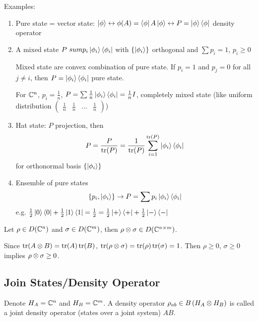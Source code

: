 Examples:
\begin{enumerate}[label=\protect\cir{\arabic*}]
    \item Pure state = vector state: $\left|\phi\right\rangle \leftrightarrow \phi(A) = \left\langle \phi\right|A\left|\phi\right\rangle \leftrightarrow P = \left|\phi\right\rangle\left\langle \phi\right|$ density operator
    \item A mixed state $P \ sum p_i\left|\phi_i\right\rangle\left\langle \phi_i\right|$ with $\left\lbrace\left|\phi_i\right\rangle\right\rbrace$ orthogonal and $\sum p_i = 1$, $p_i \geq 0$

          Mixed state are convex combination of pure state. If $p_i = 1$ and $p_j = 0$ for all $j \neq i$, then
          $P = \left|\phi_i\right\rangle\left\langle \phi_i\right|$ pure state.

          For $\mathbb{C}^n$, $p_i = \frac{1}{n}$,
          $P = \sum \frac{1}{n} \left|\phi_i\right\rangle\left\langle \phi_i\right| = \frac{1}{n}I$, completely mixed state
          (like uniform distribution $\begin{pmatrix}\frac{1}{n}&\frac{1}{n}&\dots&\frac{1}{n}\end{pmatrix}$)
    \item Hat state: $P$ projection, then \[P = \frac{P}{\operatorname{tr}(P)} = \frac{1}{\operatorname{tr}(P)}\sum_{i=1}^{\operatorname{tr}(P)}\left|\phi_i\right\rangle\left\langle \phi_i\right|\]
          for orthonormal basis $\left\lbrace\left|\phi_i\right\rangle\right\rbrace$
    \item Ensemble of pure states
          \[\left\lbrace p_i, \left|\phi_i\right\rangle\right\rbrace \to P = \sum p_i\left|\phi_i\right\rangle\left\langle \phi_i\right|\]
          e.g. $\frac{1}{2}\left|0\right\rangle\left\langle 0\right| + \frac{1}{2}\left|1\right\rangle\left\langle 1\right| = \frac{1}{2} = \frac{1}{2}\left|+\right\rangle\left\langle +\right| + \frac{1}{2}\left|-\right\rangle\left\langle -\right|$
\end{enumerate}

\begin{definition}
    Let $\rho \in D(\mathbb{C}^n)$ and $\sigma\in D(\mathbb{C}^m)$, then $\rho \otimes \sigma \in D(\mathbb{C}^{n \times m})$.
\end{definition}

Since $\operatorname{tr}(A\otimes B) = \operatorname{tr}(A)\operatorname{tr}(B)$, $\operatorname{tr}(\rho\otimes \sigma) = \operatorname{tr}(\rho)\operatorname{tr}(\sigma) = 1$.
Then $\rho \geq 0$, $\sigma \geq 0$ implies $\rho \otimes \sigma \geq 0$.

\subsection{Join States/Density Operator}
Denote $H_A = \mathbb{C}^n$ and $H_B = \mathbb{C}^m$. A density operator
$\rho_{ab} \in B\left(H_A \otimes H_B\right)$ is called a joint density operator
(states over a joint system) $AB$.

